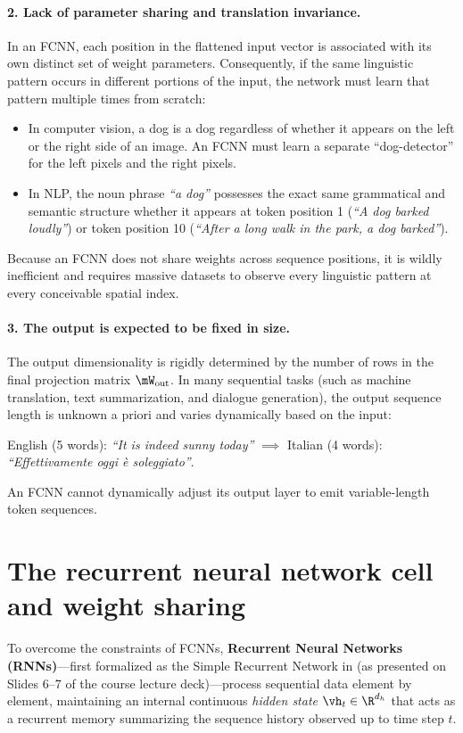 \documentclass[../../main.tex]{subfiles}
\begin{document}
\paragraph{2. Lack of parameter sharing and translation invariance.}
In an FCNN, each position in the flattened input vector is associated with its own distinct set of weight parameters. Consequently, if the same linguistic pattern occurs in different portions of the input, the network must learn that pattern multiple times from scratch:
\begin{itemize}
    \item In computer vision, a dog is a dog regardless of whether it appears on the left or the right side of an image. An FCNN must learn a separate ``dog-detector'' for the left pixels and the right pixels.
    \item In NLP, the noun phrase \textit{``a dog''} possesses the exact same grammatical and semantic structure whether it appears at token position 1 (\textit{``A dog barked loudly''}) or token position 10 (\textit{``After a long walk in the park, a dog barked''}).
\end{itemize}
Because an FCNN does not share weights across sequence positions, it is wildly inefficient and requires massive datasets to observe every linguistic pattern at every conceivable spatial index.

\paragraph{3. The output is expected to be fixed in size.}
The output dimensionality is rigidly determined by the number of rows in the final projection matrix $\mW_{\text{out}}$. In many sequential tasks (such as machine translation, text summarization, and dialogue generation), the output sequence length is unknown a priori and varies dynamically based on the input:
\begin{center}
English (5 words): \textit{``It is indeed sunny today''} $\implies$ Italian (4 words): \textit{``Effettivamente oggi è soleggiato''}.
\end{center}
An FCNN cannot dynamically adjust its output layer to emit variable-length token sequences.

\section{The recurrent neural network cell and weight sharing}
\label{sec:rnn_cell}

To overcome the constraints of FCNNs, \textbf{Recurrent Neural Networks (RNNs)}---first formalized as the Simple Recurrent Network in \cite{elman1990} (as presented on Slides 6--7 of the course lecture deck)---process sequential data element by element, maintaining an internal continuous \emph{hidden state} $\vh_t \in \R^{d_h}$ that acts as a recurrent memory summarizing the sequence history observed up to time step $t$.
\end{document}
